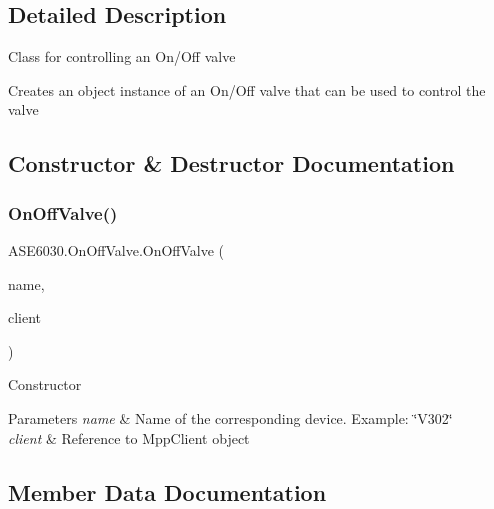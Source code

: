 \subsection{Detailed Description}
Class for controlling an On/\+Off valve 

Creates an object instance of an On/\+Off valve that can be used to control the valve 

\subsection{Constructor \& Destructor Documentation}
\mbox{\label{class_a_s_e6030_1_1_on_off_valve_a210880c9d65d53684d468e0290b84772}} 
\subsubsection{\texorpdfstring{On\+Off\+Valve()}{OnOffValve()}}
{\footnotesize\ttfamily A\+S\+E6030.\+On\+Off\+Valve.\+On\+Off\+Valve (\begin{DoxyParamCaption}\item[{String}]{name,  }\item[{ref Tut.\+Mpp\+Opc\+Ua\+Client\+Lib.\+Mpp\+Client}]{client }\end{DoxyParamCaption})\hspace{0.3cm}{\ttfamily [inline]}}



Constructor 


\begin{DoxyParams}{Parameters}
{\em name} & Name of the corresponding device. Example\+: \char`\"{}\+V302\char`\"{}\\
\hline
{\em client} & Reference to Mpp\+Client object\\
\hline
\end{DoxyParams}


\subsection{Member Data Documentation}
\mbox{\label{class_a_s_e6030_1_1_on_off_valve_a0e67c47fbb52742581ce500f22fbb288}} 
